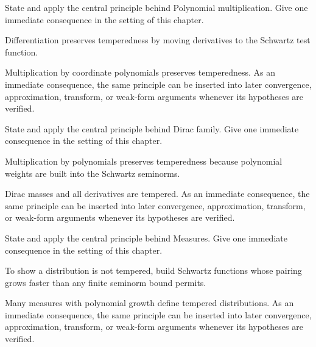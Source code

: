\begin{exercise}\label{exr:iii18-05}
State and apply the central principle behind Polynomial multiplication. Give one immediate consequence in the setting of this chapter.
\end{exercise}
\begin{hint}
Differentiation preserves temperedness by moving derivatives to the Schwartz test function.
\end{hint}
\begin{solution}
Multiplication by coordinate polynomials preserves temperedness. As an immediate consequence, the same principle can be inserted into later convergence, approximation, transform, or weak-form arguments whenever its hypotheses are verified.
\end{solution}

\begin{exercise}\label{exr:iii18-06}
State and apply the central principle behind Dirac family. Give one immediate consequence in the setting of this chapter.
\end{exercise}
\begin{hint}
Multiplication by polynomials preserves temperedness because polynomial weights are built into the Schwartz seminorms.
\end{hint}
\begin{solution}
Dirac masses and all derivatives are tempered. As an immediate consequence, the same principle can be inserted into later convergence, approximation, transform, or weak-form arguments whenever its hypotheses are verified.
\end{solution}

\begin{exercise}\label{exr:iii18-07}
State and apply the central principle behind Measures. Give one immediate consequence in the setting of this chapter.
\end{exercise}
\begin{hint}
To show a distribution is not tempered, build Schwartz functions whose pairing grows faster than any finite seminorm bound permits.
\end{hint}
\begin{solution}
Many measures with polynomial growth define tempered distributions. As an immediate consequence, the same principle can be inserted into later convergence, approximation, transform, or weak-form arguments whenever its hypotheses are verified.
\end{solution}

